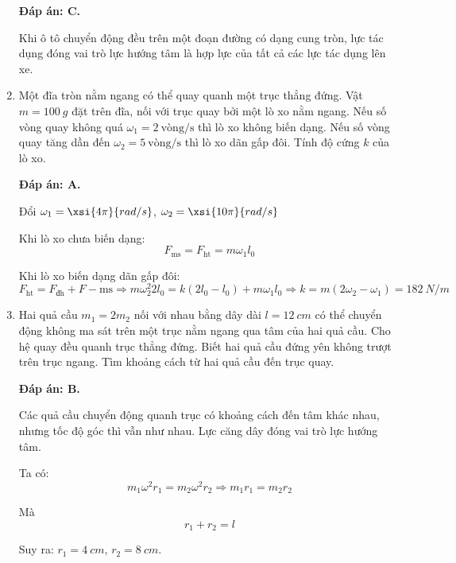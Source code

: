 \begin{enumerate}[label=\bfseries Câu \arabic*:]
	\hideall
	{	
		\textbf{Đáp án: C.}
		
		Khi ô tô chuyển động đều trên một đoạn đường có dạng cung tròn, lực tác dụng đóng vai trò lực hướng tâm là hợp lực của tất cả các lực tác dụng lên xe.
	}
	\item {}
	
	
	{
		Một đĩa tròn nằm ngang có thể quay quanh một trục thẳng đứng. Vật $m=\SI{100}{g}$ đặt trên đĩa, nối với trục quay bởi một lò xo nằm ngang. Nếu số vòng quay không quá $\omega_1 = 2\ \text{vòng/s}$ thì lò xo không biến dạng. Nếu số vòng quay tăng dần đến $\omega_2 = 5\ \text{vòng/s}$ thì lò xo dãn gấp đôi. Tính độ cứng $k$ của lò xo.
	}
	
	\hideall
	{	
		\textbf{Đáp án: A.}
		
		Đổi $\omega_1=\xsi{4\pi}{rad/s}$, $\omega_2 = \xsi{10\pi}{rad/s}$
		
		Khi lò xo chưa biến dạng:
		$$F_\text{ms} = F_\text{ht} = m \omega_1 l_0$$
		
		Khi lò xo biến dạng dãn gấp đôi:
		$$F_\text{ht} = F_\text{đh} + F-\text{ms} \Rightarrow m \omega_2 ^2 2l_0 = k (2l_0 - l_0) + m \omega_1 l_0 \Rightarrow k = m(2\omega_2 - \omega_1) = \SI{182}{N/m}$$
	}
	
	\item {}
	
	
	{
		Hai quả cầu $m_1=2m_2$ nối với nhau bằng dây dài $l=\SI{12}{cm}$ có thể chuyển động không ma sát trên một trục nằm ngang qua tâm của hai quả cầu. Cho hệ quay đều quanh trục thẳng đứng. Biết hai quả cầu đứng yên không trượt trên trục ngang. Tìm khoảng cách từ hai quả cầu đến trục quay.
	}
	
	\hideall
	{	
		\textbf{Đáp án: B.}
		
		Các quả cầu chuyển động quanh trục có khoảng cách đến tâm khác nhau, nhưng tốc độ góc thì vẫn như nhau. Lực căng dây đóng vai trò lực hướng tâm.
		
		Ta có:
		$$m_1 \omega^2 r_1 = m_2 \omega^2 r_2 \Rightarrow m_1 r_1 = m_2 r_2$$
		
		Mà $$r_1+r_2 = l$$
		
		Suy ra: $r_1 = \SI{4}{cm}$, $r_2 = \SI{8}{cm}$.		
	}
\end{enumerate}
